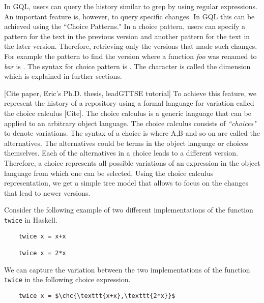 In GQL, users can query the history similar to grep by using regular expressions.
An important feature is, however, to query specific changes. In GQL this can be achieved using the ``Choice Patterns."  In a choice pattern, users can specify a pattern for the text in the previous version and another pattern for the text in the later version. Therefore, retrieving only the versions that made such changes. For example the pattern to find the version where a function \textit{foo} was renamed to \textit{bar} is \textit{}. The syntax for choice pattern is {}. The character {\dimMeta} is called the dimension which is explained in further sections.

[Cite paper, Eric's Ph.D. thesis, leadGTTSE tutorial]
To achieve this feature, we represent the history of a repository using a formal language for variation called the choice calculus [Cite]. The choice calculus is a generic language that can be applied to an arbitrary object language. The choice calculus consists of \textit{``choices"} to denote variations. The syntax of a choice is {} where A,B and so on are called the alternatives. The alternatives could be terms in the object language or choices themselves. Each of the alternatives in a choice leads to a different version. Therefore, a choice represents all possible variations of an expression in the object language from which one can be selected. Using the choice calculus representation, we get a simple tree model that allows to focus on the changes that lead to newer versions.

Consider the following example of two different implementations of the function \texttt{twice} in Haskell.

\begin{lstlisting}
	twice x = x+x
        
	twice x = 2*x
\end{lstlisting}
        
We can capture the variation between the two implementations of the function \texttt{twice} in the following choice expression.

\begin{lstlisting}
	twice x = $\chc{\texttt{x+x},\texttt{2*x}}$
\end{lstlisting}

